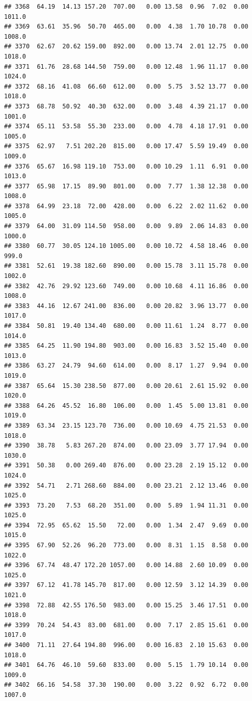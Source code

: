 \documentclass{article}\usepackage{graphicx, color}
\makeatletter
\newenvironment{kframe}{%
 \def\at@end@of@kframe{}%
 \ifinner\ifhmode%
  \def\at@end@of@kframe{\end{minipage}}%
  \begin{minipage}{\columnwidth}%
 \fi\fi%
 \def\FrameCommand##1{\hskip\@totalleftmargin \hskip-\fboxsep
 \colorbox{shadecolor}{##1}\hskip-\fboxsep
     \hskip-\linewidth \hskip-\@totalleftmargin \hskip\columnwidth}%
 \MakeFramed {\advance\hsize-\width
   \@totalleftmargin\z@ \linewidth\hsize
   \@setminipage}}%
 {\par\unskip\endMakeFramed%
 \at@end@of@kframe}
\newenvironment{knitrout}{}{} %
\makeatother
\begin{document}
\begin{knitrout}
\begin{kframe}
\begin{verbatim}
## 3368  64.19  14.13 157.20  707.00   0.00 13.58  0.96  7.02  0.00 1011.0
## 3369  63.61  35.96  50.70  465.00   0.00  4.38  1.70 10.78  0.00 1008.0
## 3370  62.67  20.62 159.00  892.00   0.00 13.74  2.01 12.75  0.00 1018.0
## 3371  61.76  28.68 144.50  759.00   0.00 12.48  1.96 11.17  0.00 1024.0
## 3372  68.16  41.08  66.60  612.00   0.00  5.75  3.52 13.77  0.00 1018.0
## 3373  68.78  50.92  40.30  632.00   0.00  3.48  4.39 21.17  0.00 1001.0
## 3374  65.11  53.58  55.30  233.00   0.00  4.78  4.18 17.91  0.00 1005.0
## 3375  62.97   7.51 202.20  815.00   0.00 17.47  5.59 19.49  0.00 1009.0
## 3376  65.67  16.98 119.10  753.00   0.00 10.29  1.11  6.91  0.00 1013.0
## 3377  65.98  17.15  89.90  801.00   0.00  7.77  1.38 12.38  0.00 1008.0
## 3378  64.99  23.18  72.00  428.00   0.00  6.22  2.02 11.62  0.00 1005.0
## 3379  64.00  31.09 114.50  958.00   0.00  9.89  2.06 14.83  0.00 1000.0
## 3380  60.77  30.05 124.10 1005.00   0.00 10.72  4.58 18.46  0.00  999.0
## 3381  52.61  19.38 182.60  890.00   0.00 15.78  3.11 15.78  0.00 1002.0
## 3382  42.76  29.92 123.60  749.00   0.00 10.68  4.11 16.86  0.00 1008.0
## 3383  44.16  12.67 241.00  836.00   0.00 20.82  3.96 13.77  0.00 1017.0
## 3384  50.81  19.40 134.40  680.00   0.00 11.61  1.24  8.77  0.00 1014.0
## 3385  64.25  11.90 194.80  903.00   0.00 16.83  3.52 15.40  0.00 1013.0
## 3386  63.27  24.79  94.60  614.00   0.00  8.17  1.27  9.94  0.00 1019.0
## 3387  65.64  15.30 238.50  877.00   0.00 20.61  2.61 15.92  0.00 1020.0
## 3388  64.26  45.52  16.80  106.00   0.00  1.45  5.00 13.81  0.00 1019.0
## 3389  63.34  23.15 123.70  736.00   0.00 10.69  4.75 21.53  0.00 1018.0
## 3390  38.78   5.83 267.20  874.00   0.00 23.09  3.77 17.94  0.00 1030.0
## 3391  50.38   0.00 269.40  876.00   0.00 23.28  2.19 15.12  0.00 1024.0
## 3392  54.71   2.71 268.60  884.00   0.00 23.21  2.12 13.46  0.00 1025.0
## 3393  73.20   7.53  68.20  351.00   0.00  5.89  1.94 11.31  0.00 1025.0
## 3394  72.95  65.62  15.50   72.00   0.00  1.34  2.47  9.69  0.00 1015.0
## 3395  67.90  52.26  96.20  773.00   0.00  8.31  1.15  8.58  0.00 1022.0
## 3396  67.74  48.47 172.20 1057.00   0.00 14.88  2.60 10.09  0.00 1025.0
## 3397  67.12  41.78 145.70  817.00   0.00 12.59  3.12 14.39  0.00 1021.0
## 3398  72.88  42.55 176.50  983.00   0.00 15.25  3.46 17.51  0.00 1018.0
## 3399  70.24  54.43  83.00  681.00   0.00  7.17  2.85 15.61  0.00 1017.0
## 3400  71.11  27.64 194.80  996.00   0.00 16.83  2.10 15.63  0.00 1018.0
## 3401  64.76  46.10  59.60  833.00   0.00  5.15  1.79 10.14  0.00 1009.0
## 3402  66.16  54.58  37.30  190.00   0.00  3.22  0.92  6.72  0.00 1007.0

\end{verbatim}
\end{kframe}
\end{knitrout}
\end{document}
